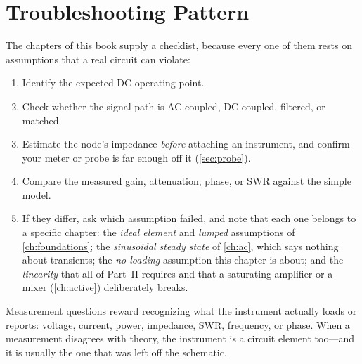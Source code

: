 \section{Troubleshooting Pattern}
The chapters of this book supply a checklist, because every one of them rests on
assumptions that a real circuit can violate:
\begin{enumerate}
\item Identify the expected DC operating point.
\item Check whether the signal path is AC-coupled, DC-coupled, filtered, or matched.
\item Estimate the node's impedance \emph{before} attaching an instrument, and confirm
your meter or probe is far enough off it (\cref{sec:probe}).
\item Compare the measured gain, attenuation, phase, or SWR against the simple model.
\item If they differ, ask which assumption failed, and note that each one belongs to a
specific chapter: the \emph{ideal element} and \emph{lumped} assumptions of
\cref{ch:foundations}; the \emph{sinusoidal steady state} of \cref{ch:ac}, which says
nothing about transients; the \emph{no-loading} assumption this chapter is about; and
the \emph{linearity} that all of Part~II requires and that a saturating amplifier or a
mixer (\cref{ch:active}) deliberately breaks.
\end{enumerate}

\begin{exambox}
Measurement questions reward recognizing what the instrument actually loads or
reports: voltage, current, power, impedance, SWR, frequency, or phase. When a
measurement disagrees with theory, the instrument is a circuit element too---and it is
usually the one that was left off the schematic.
\end{exambox}
